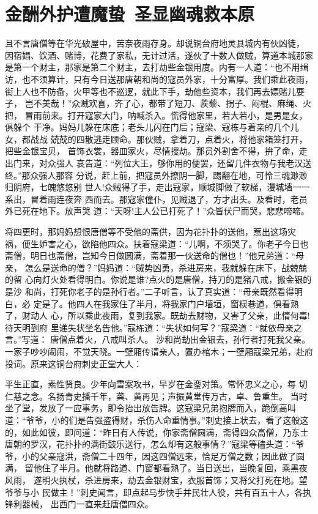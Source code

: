 \chapter{金酬外护遭魔蛰~圣显幽魂救本原}

且不言唐僧等在华光破屋中，苦奈夜雨存身。却说铜台府地灵县城内有伙凶徒，
因宿娼、饮酒、赌博，花费了家私，无计过活，遂伙了十数人做贼，算道本城那家
是第一个财主，那家是第二个财主，去打劫些金银用度。内有一人道：“也不用缉
访，也不须算计，只有今日送那唐朝和尚的寇员外家，十分富厚。我们乘此夜雨，
街上人也不防备，火甲等也不巡逻，就此下手，劫他些资本，我们再去嫖赌儿耍子，
岂不美哉！”众贼欢喜，齐了心，都带了短刀、蒺藜、拐子、闷棍、麻绳、火把，
冒雨前来。打开寇家大门，呐喊杀入。慌得他家里，若大若小，是男是女，俱躲个
干净。妈妈儿躲在床底；老头儿闪在门后；寇梁、寇栋与着亲的几个儿女，都战战
兢兢的四散逃走顾命。那伙贼，拿着刀，点着火，将他家箱笼打开，把些金银宝贝，
首饰衣裳，器皿家火，尽情搜劫。那员外割舍不得，拚了命，走出门来，对众强人
哀告道：“列位大王，够你用的便罢，还留几件衣物与我老汉送终。”那众强人那容
分说，赶上前，把寇员外撩阴一脚，踢翻在地，可怜三魂渺渺归阴府，七魄悠悠别
世人!众贼得了手，走出寇家，顺城脚做了软梯，漫城墙一一系出，冒着雨连夜奔
西而去。那寇家僮仆，见贼退了，方才出头。及看时，老员外已死在地下。放声哭
道：“天呀!主人公已打死了！”众皆伏尸而哭，悲悲啼啼。

将四更时，那妈妈想恨唐僧等不受他的斋供，因为花扑扑的送他，惹出这场灾
祸，便生妒害之心，欲陷他四众。扶着寇梁道：“儿啊，不须哭了。你老子今日也
斋僧，明日也斋僧，岂知今日做圆满，斋着那一伙送命的僧也！”他兄弟道：“母亲，
怎么是送命的僧？”妈妈道：“贼势凶勇，杀进房来，我就躲在床下，战兢兢的留
心向灯火处看得明白。你说是谁?点火的是唐僧，持刀的是猪八戒，搬金银的是沙
和尚，打死你老子的是孙行者。”二子听言，认了真实道：“母亲既然看得明白，必
定是了。他四人在我家住了半月，将我家门户墙垣，窗棂巷道，俱看熟了，财动人
心，所以乘此夜雨，复到我家。既劫去财物，又害了父亲，此情何毒!待天明到府
里递失状坐名告他。”寇栋道：“失状如何写？”寇梁道：“就依母亲之言。”写道：
唐僧点着火，八戒叫杀人。
沙和尚劫出金银去，孙行者打死我父亲。
一家子吵吵闹闹，不觉天晓。一壁厢传请亲人，置办棺木；一壁厢寇梁兄弟，赴府
投词。原来这铜台府刺史正堂大人：

平生正直，素性贤良。少年向雪案攻书，早岁在金銮对策。常怀忠义之心，每
切仁慈之念。名扬青史播千年，龚、黄再见；声振黄堂传万古，卓、鲁重生。
当时坐了堂，发放了一应事务，即令抬出放告牌。这寇梁兄弟抱牌而入，跪倒高叫
道：“爷爷，小的们是告强盗得财，杀伤人命重情事。”刺史接上状去，看了这般这
的，如此如彼，即问道：“昨日有人传说，你家斋僧圆满，斋得四众高僧，乃东土
唐朝的罗汉，花扑扑的满街鼓乐送行，怎么却有这般事情？”寇梁等磕头道：“爷
爷，小的父亲寇洪，斋僧二十四年，因这四僧远来，恰足万僧之数；因此做了圆满，
留他住了半月。他就将路道、门窗都看熟了。当日送出，当晚复回，乘黑夜风雨，
遂明火执杖，杀进房来，劫去金银财宝，衣服首饰；又将父打死在地。望爷爷与小
民做主！”刺史闻言，即点起马步快手并民壮人役，共有百五十人，各执锋利器械，
出西门一直来赶唐僧四众。

